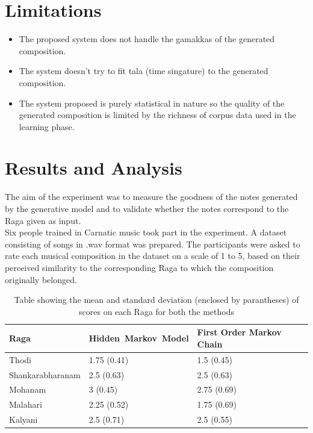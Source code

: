 \documentclass[journal]{IEEEtran}
\begin{document}
\section{Limitations}
\begin{itemize}
  \item The proposed system does not handle the gamakkas of the generated composition. 
  \item The system doesn't try to fit tala (time singature) to the generated composition.
  \item The system proposed is purely statistical in nature so the quality of the generated composition is limited by the richness of corpus data used in the learning phase.
\end{itemize}

\section{Results and Analysis}
The aim of the experiment was to measure the goodness of the notes generated by the generative model and to validate whether the notes correspond to the Raga given as input.\\
Six people trained in Carnatic music took part in the experiment. A dataset consisting of songs in .wav format was prepared. The participants were asked to rate each musical composition in the dataset on a scale of 1 to 5, based on their perceived similarity to the corresponding Raga to which the composition originally belonged.\\

\begin{table}[ht]
\centering
\caption{Table showing the mean and standard deviation (enclosed by parantheses) of scores on each Raga for both the methods}
\begin{tabu} to 0.5\textwidth { | X[l] | X[c] | X[r] | }
 \hline
 Raga & Hidden~Markov~Model & First Order Markov Chain \\
 \hline
 Thodi & 1.75 (0.41) & 1.5 (0.45) \\
 \hline
 Shankarabharanam & 2.5 (0.63) & 2.5 (0.63) \\
 \hline
 Mohanam & 3 (0.45) & 2.75 (0.69) \\
 \hline
 Malahari & 2.25 (0.52) & 1.75 (0.69) \\
 \hline
 Kalyani & 2.5 (0.71) & 2.5 (0.55) \\
 \hline
\end{tabu}
\label{table:1}
\end{table}
\end{document}
